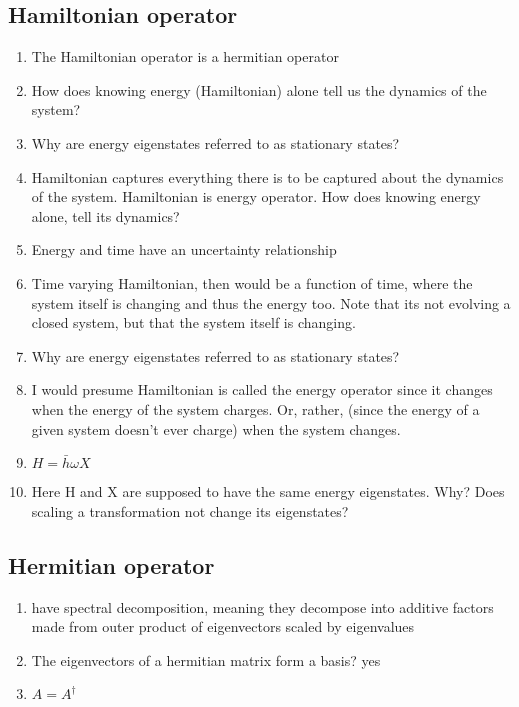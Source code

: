 \documentclass{article}
\begin{document}
    \subsection{Hamiltonian operator}
    \begin{enumerate}
        \item The Hamiltonian operator is a hermitian operator
        \item How does knowing energy (Hamiltonian) alone tell us the dynamics of the system? 
        \item Why are energy eigenstates referred to as stationary states? 
        \item Hamiltonian captures everything there is to be captured about the dynamics of the system. Hamiltonian is energy operator. How does knowing energy alone, tell its dynamics?
        \item Energy and time have an uncertainty relationship
        \item Time varying Hamiltonian, then would be a function of time, where the system itself is changing and thus the energy too. Note that its not evolving a closed system, but that the system itself is changing.
        \item Why are energy eigenstates referred to as stationary states?
        \item I would presume Hamiltonian is called the energy operator since it changes when the energy of the system charges. Or, rather, (since the energy of a given system doesn't ever charge) when the system changes.
        \item $H = \bar{h}\omega X$
        \item Here H and X are supposed to have the same energy eigenstates. Why? Does scaling a transformation not change its eigenstates?




    \end{enumerate}

    \subsection{Hermitian operator}
    \begin{enumerate}
        \item have spectral decomposition, meaning they decompose into additive factors made from outer product of eigenvectors scaled by eigenvalues 
        \item The eigenvectors of a hermitian matrix form a basis? yes 
        \item $A = A^\dagger$

    \end{enumerate}
\end{document}

